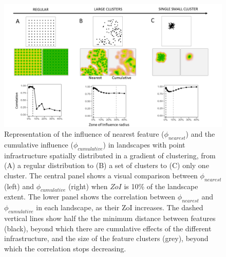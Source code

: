 \documentclass[titlepage]{article}
\begin{document}
\begin{figure}[h]
\centering
\includegraphics[width=1.3\textwidth,center]{figures/simulated_landscapes.png}
\caption{\label{fig:simulated_landscapes} Representation of the influence of nearest feature ($\phi_{nearest}$) and the cumulative influence ($\phi_{cumulative}$) in landscapes with point infrastructure spatially distributed in a gradient of clustering, from (A) a regular distribution 
to (B) a set of clusters 
to (C) only one cluster. 
The central panel shows a visual comparison between $\phi_{nearest}$ (left) and $\phi_{cumulative}$ (right) when $ZoI$ is 10\% of the landscape extent. The lower panel shows the correlation between $\phi_{nearest}$ and $\phi_{cumulative}$ in each landscape, as their ZoI increases. The dashed vertical lines show half the the minimum distance between features (black), beyond which there are cumulative effects of the different infrastructure, and the size of the feature clusters (grey), beyond which the correlation stops decreasing.}
\end{figure}
\end{document}
